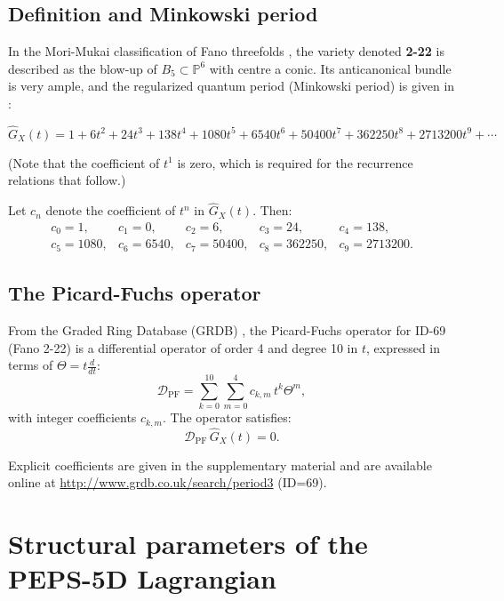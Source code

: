 \documentclass[12pt]{article}
\begin{document}
\subsection{Definition and Minkowski period}

In the Mori-Mukai classification of Fano threefolds \cite{mori1981,mori1986},
the variety denoted \textbf{2-22} is described as the blow-up of $B_5 \subset \mathbb{P}^6$
with centre a conic. Its anticanonical bundle is very ample, and the
regularized quantum period (Minkowski period) is given in
\cite[page 56]{coates2013}:

\[
\widehat{G}_X(t) = 1 + 6t^2 + 24t^3 + 138t^4 + 1080t^5 + 6540t^6 + 50400t^7 + 362250t^8 + 2713200t^9 + \cdots
\]

\noindent
(Note that the coefficient of $t^1$ is zero, which is required for the
recurrence relations that follow.)

Let $c_n$ denote the coefficient of $t^n$ in $\widehat{G}_X(t)$. Then:
\[
\begin{array}{lllll}
c_0 = 1,      & c_1 = 0,      & c_2 = 6,      & c_3 = 24,     & c_4 = 138,   \\
c_5 = 1080,   & c_6 = 6540,   & c_7 = 50400,  & c_8 = 362250, & c_9 = 2713200.
\end{array}
\]

\subsection{The Picard-Fuchs operator}

From the Graded Ring Database (GRDB) \cite{grdb}, the Picard-Fuchs operator
for ID-69 (Fano 2-22) is a differential operator of order 4 and degree 10
in $t$, expressed in terms of $\Theta = t\frac{d}{dt}$:
\begin{equation}
\mathcal{D}_{\text{PF}} = \sum_{k=0}^{10} \sum_{m=0}^{4} c_{k,m} \, t^k \Theta^m ,
\label{eq:pf_operator}
\end{equation}
with integer coefficients $c_{k,m}$. The operator satisfies:
\[
\mathcal{D}_{\text{PF}} \,\widehat{G}_X(t) = 0.
\]

Explicit coefficients are given in the supplementary material and
are available online at \url{http://www.grdb.co.uk/search/period3} (ID=69).

\section{Structural parameters of the PEPS-5D Lagrangian}
\end{document}
